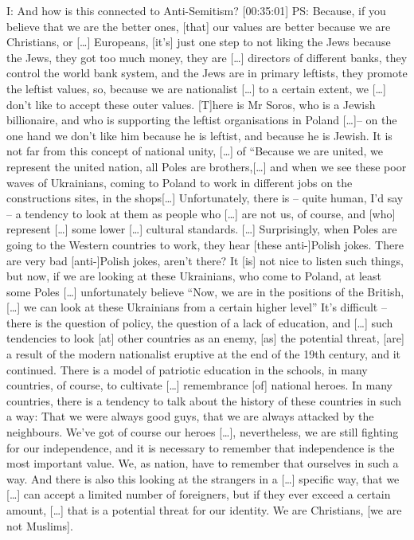 I: And how is this connected to Anti-Semitism? [00:35:01]
PS: Because, if you believe that we are the better ones, [that] our values are better because we are Christians, or […] Europeans, [it’s] just one step to not liking the Jews because the Jews, they got too much money, they are […] directors of different banks, they control the world bank system, and the Jews are in primary leftists, they promote the leftist values, so, because we are nationalist […] to a certain extent, we […] don’t like to accept these outer values. [T]here is Mr Soros, who is a Jewish billionaire, and who is supporting the leftist organisations in Poland […]– on the one hand we don’t like him because he is leftist, and because he is Jewish. It is not far from this concept of national unity, […] of “Because we are united, we represent the united nation, all Poles are brothers,[…] and when we see these poor waves of Ukrainians, coming to Poland to work in different jobs on the constructions sites, in the shops[…] Unfortunately, there is – quite human, I’d say – a tendency to look at them as people who […] are not us, of course, and [who] represent […] some lower […] cultural standards. […] Surprisingly, when Poles are going to the Western countries to work, they hear [these anti-]Polish jokes. There are very bad [anti-]Polish jokes, aren’t there? It [is] not nice to listen such things, but now, if we are looking at these Ukrainians, who come to Poland, at least some Poles […] unfortunately believe “Now, we are in the positions of the British, […] we can look at these Ukrainians from a certain higher level” It’s difficult – there is the question of policy, the question of a lack of education, and […] such tendencies to look [at] other countries as an enemy, [as] the potential threat, [are] a result of the modern nationalist eruptive at the end of the 19th century, and it continued. There is a model of patriotic education in the schools, in many countries, of course, to cultivate […] remembrance [of] national heroes. In many countries, there is a tendency to talk about the history of these countries in such a way: That we were always good guys, that we are always attacked by the neighbours. We’ve got of course our heroes […], nevertheless, we are still fighting for our independence, and it is necessary to remember that independence is the most important value. We, as nation, have to remember that ourselves in such a way. And there is also this looking at the strangers in a […] specific way, that we […] can accept a limited number of foreigners, but if they ever exceed a certain amount, […] that is a potential threat for our identity. We are Christians, [we are not Muslims].
